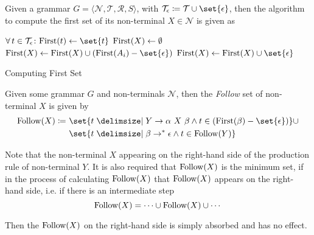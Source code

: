 \begin{definition}
    Given a grammar $G = \langle \mathcal{N}, \mathcal{T}, \mathcal{R}, S \rangle$, with $\mathcal{T}_\epsilon \coloneq \mathcal{T} \cup \set{\epsilon}$, then the algorithm to compute the first set of its non-terminal $X \in \mathcal{N}$ is given as
    \begin{algorithm}
        \begin{algorithmic}[1]
                \State $\Forall t \in \mathcal{T}_\epsilon \colon  \First{t} \gets \set{t}$
                \State $\mathrm{First}{(X)} \gets \emptyset$
                        \State $\First{X} \gets \First{X} \cup (\First{A_i} - \set{\epsilon})$
                            \State {}
                        \EndIf
                    \EndFor
                    \State $\First{X} \gets \First{X} \cup \set{\epsilon}$ 
                \EndFor
                \State {}
            \EndProcedure
        \end{algorithmic}
        \caption{Computing First Set}
        \label{prog:compute-first-set}
    \end{algorithm}
\end{definition}

\begin{definition}
    Given some grammar $G$ and non-terminals $\mathcal{N}$, then the \textit{Follow} set of non-terminal $X$ is given by
    \begin{equation}
        \begin{split}
            \Follow{X} \coloneqq &\ \set{ t \given Y \to \alpha\ X\ \beta \land t \in (\First{\beta} - \set{\epsilon}) } 
            \cup \\ &\ \set{ t \given \beta \to^\ast \epsilon \land t \in \Follow{Y} }
        \end{split}
    \end{equation}
    
    Note that the non-terminal $X$ appearing on the right-hand side of the production rule of non-terminal $Y$. It is also required that $\mathrm{Follow}{(X)}$ is the minimum set, if in the process of calculating $\mathrm{Follow}{(X)}$ that $\mathrm{Follow}{(X)}$ appears on the right-hand side, i.e. if there is an intermediate step
    \begin{equation}
        \mathrm{Follow}{(X)} = \cdots \cup \mathrm{Follow}{(X)} \cup \cdots
    \end{equation}
    
    Then the $\mathrm{Follow}{(X)}$ on the right-hand side is simply absorbed and has no effect.
\end{definition}

